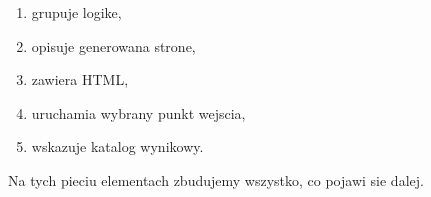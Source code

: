 \begin{enumerate}
  \item {} grupuje logike,
  \item {} opisuje generowana strone,
  \item {} zawiera HTML,
  \item {} uruchamia wybrany punkt wejscia,
  \item {} wskazuje katalog wynikowy.
\end{enumerate}

Na tych pieciu elementach zbudujemy wszystko, co pojawi sie dalej.

